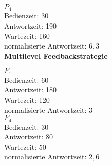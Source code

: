 \documentclass[a4paper,11pt]{article}             %
\begin{document}
\textbf{$P_4$} \\
Bedienzeit: 30 \\
Antwortzeit: 190 \\
Wartezeit: 160 \\
normalisierte Antwortzeit: $6,3$ \\

\textbf{Multilevel Feedbackstrategie}

\textbf{$P_1$} \\
Bedienzeit: 60 \\
Antwortzeit: 180 \\
Wartezeit: 120 \\
normalisierte Antwortzeit: $3$ \\

\textbf{$P_4$} \\
Bedienzeit: 30 \\
Antwortzeit: 80 \\
Wartezeit: 50 \\
normalisierte Antwortzeit: $2,6$ \\
\end{document}
